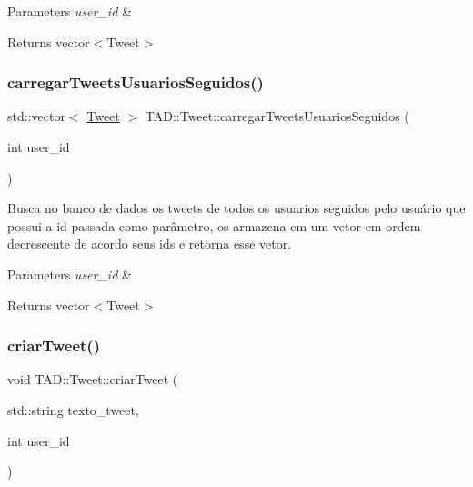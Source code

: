 \begin{DoxyParams}{Parameters}
{\em user\+\_\+id} & \\
\hline
\end{DoxyParams}
\begin{DoxyReturn}{Returns}
vector$<$\+Tweet$>$ 
\end{DoxyReturn}
\mbox{\label{class_t_a_d_1_1_tweet_a2004ca4ef3d3954806af8a088803c1ba}} 
\subsubsection{\texorpdfstring{carregar\+Tweets\+Usuarios\+Seguidos()}{carregarTweetsUsuariosSeguidos()}}
{\footnotesize\ttfamily std\+::vector$<$ \hyperlink{class_t_a_d_1_1_tweet}{Tweet} $>$ T\+A\+D\+::\+Tweet\+::carregar\+Tweets\+Usuarios\+Seguidos (\begin{DoxyParamCaption}\item[{int}]{user\+\_\+id }\end{DoxyParamCaption})}



Busca no banco de dados os tweets de todos os usuarios seguidos pelo usuário que possui a id passada como parâmetro, os armazena em um vetor em ordem decrescente de acordo seus id\textquotesingle{}s e retorna esse vetor. 


\begin{DoxyParams}{Parameters}
{\em user\+\_\+id} & \\
\hline
\end{DoxyParams}
\begin{DoxyReturn}{Returns}
vector$<$\+Tweet$>$ 
\end{DoxyReturn}
\mbox{\label{class_t_a_d_1_1_tweet_a9970f889481d1f565d042dd6644931a3}} 
\subsubsection{\texorpdfstring{criar\+Tweet()}{criarTweet()}}
{\footnotesize\ttfamily void T\+A\+D\+::\+Tweet\+::criar\+Tweet (\begin{DoxyParamCaption}\item[{std\+::string}]{texto\+\_\+tweet,  }\item[{int}]{user\+\_\+id }\end{DoxyParamCaption})}



